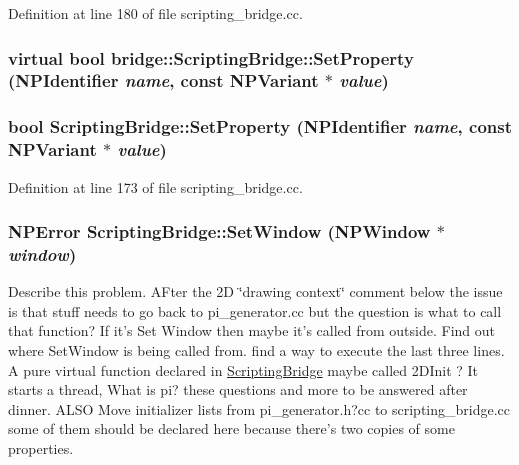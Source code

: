 Definition at line 180 of file scripting\_\-bridge.cc.

\hypertarget{classbridge_1_1_scripting_bridge_a918981b30a60d961232e693e7ac15652}{
\subsubsection[{SetProperty}]{\setlength{\rightskip}{0pt plus 5cm}virtual bool bridge::ScriptingBridge::SetProperty (NPIdentifier {\em name}, \/  const NPVariant $\ast$ {\em value})}}
\label{classbridge_1_1_scripting_bridge_a918981b30a60d961232e693e7ac15652}
\hypertarget{classbridge_1_1_scripting_bridge_ae73ff0ec0f70dfcd0e22534c8281f3e3}{
\subsubsection[{SetProperty}]{\setlength{\rightskip}{0pt plus 5cm}bool ScriptingBridge::SetProperty (NPIdentifier {\em name}, \/  const NPVariant $\ast$ {\em value})}}
\label{classbridge_1_1_scripting_bridge_ae73ff0ec0f70dfcd0e22534c8281f3e3}


Definition at line 173 of file scripting\_\-bridge.cc.

\hypertarget{classbridge_1_1_scripting_bridge_a6b2481696ae8caa5b322e7011c0228e0}{
\subsubsection[{SetWindow}]{\setlength{\rightskip}{0pt plus 5cm}NPError ScriptingBridge::SetWindow (NPWindow $\ast$ {\em window})}}
\label{classbridge_1_1_scripting_bridge_a6b2481696ae8caa5b322e7011c0228e0}
Describe this problem. AFter the 2D \char`\"{}drawing context\char`\"{} comment below the issue is that stuff needs to go back to pi\_\-generator.cc but the question is what to call that function? If it's Set Window then maybe it's called from outside. Find out where SetWindow is being called from. find a way to execute the last three lines. A pure virtual function declared in \hyperlink{classbridge_1_1_scripting_bridge}{ScriptingBridge} maybe called 2DInit ? It starts a thread, What is pi? these questions and more to be answered after dinner. ALSO Move initializer lists from pi\_\-generator.h?cc to scripting\_\-bridge.cc some of them should be declared here because there's two copies of some properties. 

